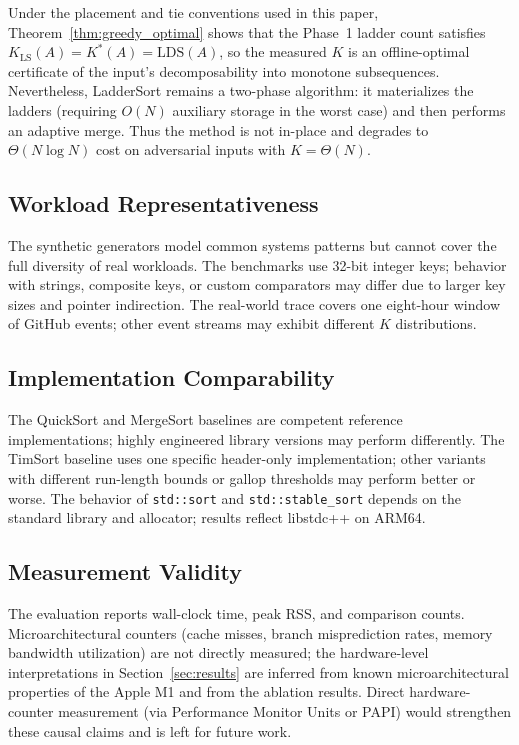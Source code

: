 \documentclass[12pt,a4paper]{article}
\theoremstyle{plain}
\theoremstyle{definition}
\begin{document}
Under the placement and tie conventions used in this paper, Theorem~\ref{thm:greedy_optimal}
shows that the Phase~1 ladder count satisfies
\(K_{\mathrm{LS}}(A)=K^*(A)=\mathrm{LDS}(A)\), so the measured $K$ is an
offline-optimal certificate of the input's decomposability into monotone
subsequences.  Nevertheless, LadderSort remains a two-phase algorithm: it
materializes the ladders (requiring $O(N)$ auxiliary storage in the worst
case) and then performs an adaptive merge.  Thus the method is not in-place
and degrades to $\Theta(N\log N)$ cost on adversarial inputs with
$K=\Theta(N)$.

\subsection{Workload Representativeness}

The synthetic generators model common systems patterns but cannot cover the
full diversity of real workloads.  The benchmarks use 32-bit integer keys;
behavior with strings, composite keys, or custom comparators may differ due
to larger key sizes and pointer indirection.  The real-world trace covers
one eight-hour window of GitHub events; other event streams may exhibit
different $K$ distributions.

\subsection{Implementation Comparability}

The QuickSort and MergeSort baselines are competent reference implementations;
highly engineered library versions may perform differently.  The TimSort
baseline uses one specific header-only implementation; other variants with
different run-length bounds or gallop thresholds may perform better or worse.
The behavior of \texttt{std::sort} and \texttt{std::stable\_sort} depends on
the standard library and allocator; results reflect libstdc++ on ARM64.

\subsection{Measurement Validity}

The evaluation reports wall-clock time, peak RSS, and comparison counts.
Microarchitectural counters (cache misses, branch misprediction rates, memory
bandwidth utilization) are not directly measured; the hardware-level
interpretations in Section~\ref{sec:results} are inferred from known
microarchitectural properties of the Apple M1 and from the ablation results.
Direct hardware-counter measurement (via Performance Monitor Units or PAPI)
would strengthen these causal claims and is left for future work.
\end{document}
